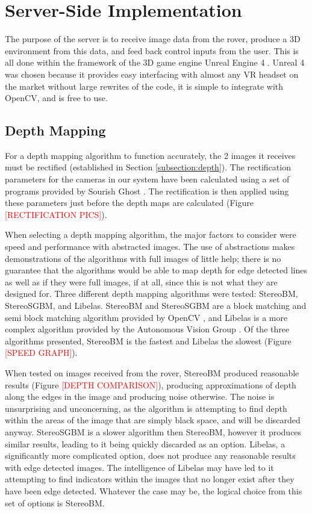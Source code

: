\chapter{Server-Side Implementation}
\label{chapter:server}


The purpose of the server is to receive image data from the rover, produce a 3D environment from this data, and feed back control inputs from the user. This is all done within the framework of the 3D game engine Unreal Engine 4 \cite{unreal}. Unreal 4 was chosen because it provides easy interfacing with almost any VR headset on the market without large rewrites of the code, it is simple to integrate with OpenCV, and is free to use.

\section{Depth Mapping}

For a depth mapping algorithm to function accurately, the 2 images it receives must be rectified (established in Section \ref{subsection:depth}). The rectification parameters for the cameras in our system have been calculated using a set of programs provided by Sourish Ghost \cite{calibgit}. The rectification is then applied using these parameters just before the depth maps are calculated (Figure \textcolor{red}{[RECTIFICATION PICS]}).

When selecting a depth mapping algorithm, the major factors to consider were speed and performance with abstracted images. The use of abstractions makes demonstrations of the algorithms with full images of little help; there is no guarantee that the algorithms would be able to map depth for edge detected lines as well as if they were full images, if at all, since this is not what they are designed for. Three different depth mapping algorithms were tested: StereoBM, StereoSGBM, and Libelas. StereoBM and StereoSGBM are a block matching and semi block matching algorithm provided by OpenCV \cite{OpenCV}, and Libelas is a more complex algorithm provided by the Autonomous Vision Group \cite{geiger2010efficient}. Of the three algorithms presented, StereoBM is the fastest and Libelas the slowest (Figure \textcolor{red}{[SPEED GRAPH]}). 

When tested on images received from the rover, StereoBM produced reasonable results (Figure \textcolor{red}{[DEPTH COMPARISON]}), producing approximations of depth along the edges in the image and producing noise otherwise. The noise is unsurprising and unconcerning, as the algorithm is attempting to find depth within the areas of the image that are simply black space, and will be discarded anyway. StereoSGBM is a slower algorithm then StereoBM, however it produces similar results, leading to it being quickly discarded as an option. Libelas, a significantly more complicated option, does not produce any reasonable results with edge detected images. The intelligence of Libelas may have led to it attempting to find indicators within the images that no longer exist after they have been edge detected. Whatever the case may be, the logical choice from this set of options is StereoBM.

